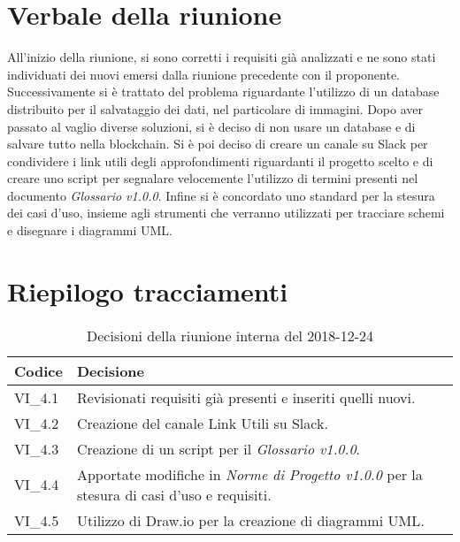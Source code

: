 \section{Verbale della riunione}
All'inizio della riunione, si sono corretti i requisiti già analizzati e ne sono 
stati individuati dei nuovi emersi dalla riunione precedente con il proponente.
Successivamente si è trattato del problema riguardante l'utilizzo di un database
distribuito per il salvataggio dei dati, nel particolare di immagini. Dopo aver
passato al vaglio diverse soluzioni, si è deciso di non usare un database e di 
salvare tutto nella blockchain\glo{}. \newline
Si è poi deciso di creare un canale su Slack per condividere i link utili degli
approfondimenti riguardanti il progetto scelto e di creare uno script per segnalare
velocemente l'utilizzo di termini presenti nel documento \textit{Glossario v1.0.0}.
Infine si è concordato uno standard per la stesura dei casi d'uso, insieme agli 
strumenti che verranno utilizzati per tracciare schemi e disegnare i diagrammi UML.

\pagebreak

\section{Riepilogo tracciamenti}

	
		
	\begin{longtable}{ >{\centering}p{} >{}p{}}
		\caption{Decisioni della riunione interna del 2018-12-24}\\	
		\rowcolorhead
		\textbf{\color{white}Codice} 
		& \centering\textbf{\color{white}Decisione} 
		\tabularnewline 
		\endfirsthead
		
		VI\_4.1 & Revisionati requisiti già presenti e inseriti quelli nuovi.
		
		\tabularnewline 
		VI\_4.2 & Creazione del canale Link Utili su Slack.
	
		\tabularnewline 
		VI\_4.3 & Creazione di un script per il \textit{Glossario v1.0.0}.
		
		\tabularnewline
		VI\_4.4 & Apportate modifiche in \textit{Norme di Progetto v1.0.0} per 
		la 
				stesura di casi d'uso e requisiti.
		
		\tabularnewline
		VI\_4.5 & Utilizzo di Draw.io per la creazione di diagrammi 
		UML.			
	
	\end{longtable}



